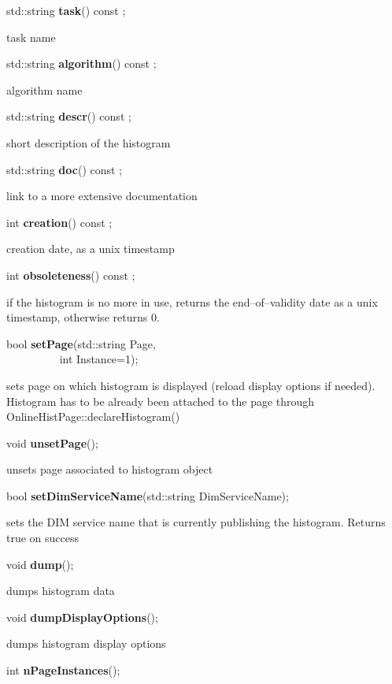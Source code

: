 \item    std::string {\bf task}() const ;

 task name


\item    std::string {\bf algorithm}() const ;

 algorithm name


\item    std::string {\bf descr}() const ;

 short description of the histogram


\item    std::string {\bf doc}() const ;

 link to a more extensive documentation


\item    int {\bf creation}() const ;

 creation date, as a unix timestamp


\item    int {\bf obsoleteness}() const ;

 if the histogram is no more in use, returns the end--of--validity date
 as a unix timestamp, otherwise returns 0.


\item    bool {\bf setPage}(std::string Page,\\\mbox{}~~~~~~~~~
	       int Instance=1);

 sets page on which histogram is displayed (reload display options if needed). Histogram has to be already
 been attached to the page through OnlineHistPage::declareHistogram()


\item    void {\bf unsetPage}();


 unsets page associated to histogram object


\item    bool {\bf setDimServiceName}(std::string DimServiceName);


 sets the DIM service name that is currently publishing the histogram. Returns true on success


\item    void {\bf dump}();


 dumps histogram data


\item    void {\bf dumpDisplayOptions}();


 dumps histogram display options


\item    int {\bf nPageInstances}();


